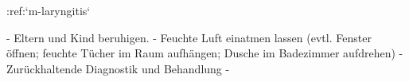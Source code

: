 %
%
:ref:`m-laryngitis`
\begin{itemize}
    -   Eltern und Kind beruhigen.
    -   Feuchte Luft einatmen lassen (evtl. Fenster
    öffnen; feuchte Tücher im Raum aufhängen; Dusche im Badezimmer aufdrehen)
    -   Zurückhaltende Diagnostik 
    und Behandlung %
    -   
\end{itemize}
